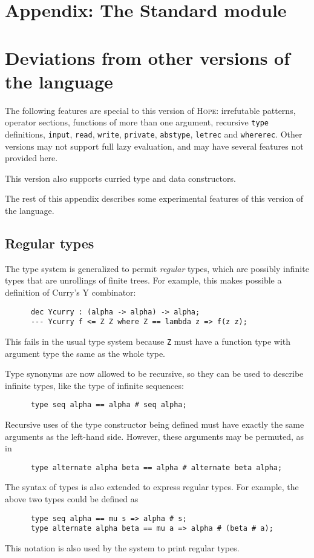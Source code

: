 \documentclass[11pt]{article}
\newcommand{\Hope}{{\scshape Hope}}
\newcommand{\Samp}[1]{\textup{\textmd{\texttt{#1}}}}
\newcommand{\Section}[2]{\section{#2}\label{sec:#1}}
\newcommand{\SubSection}[2]{\subsection{#2}\label{sec:#1}}
\begin{document}




\nocite{hope}
\nocite{tutorial}
\nocite{field&harrison}
\nocite{bailey}

\appendix

\clearpage

\Section{standard}{Appendix: The Standard module}



\clearpage

\Section{deviations}{Deviations from other versions of the language}

The following features are special to this version of \Hope:
irrefutable patterns,
operator sections,
functions of more than one argument,
recursive \Samp{type} definitions,
\Samp{input}, \Samp{read}, \Samp{write},
\Samp{private}, \Samp{abstype},
\Samp{letrec} and \Samp{whererec}.
Other versions may not support full lazy evaluation,
and may have several features not provided here.

This version also supports curried type and data constructors.

The rest of this appendix describes some experimental features of this
version of the language.

\SubSection{regular}{Regular types}

The type system is generalized to permit \emph{regular} types,
which are possibly infinite types that are unrollings of finite trees.
For example, this makes possible a definition of Curry's Y combinator:
\begin{verbatim}
      dec Ycurry : (alpha -> alpha) -> alpha;
      --- Ycurry f <= Z Z where Z == lambda z => f(z z);
\end{verbatim}
This fails in the usual type system because \Samp{Z} must have a function
type with argument type the same as the whole type.

Type synonyms are now allowed to be recursive,
so they can be used to describe infinite types,
like the type of infinite sequences:
\begin{verbatim}
      type seq alpha == alpha # seq alpha;
\end{verbatim}
Recursive uses of the type constructor being defined must have exactly
the same arguments as the left-hand side.
However, these arguments may be permuted, as in
\begin{verbatim}
      type alternate alpha beta == alpha # alternate beta alpha;
\end{verbatim}
The syntax of types is also extended to express regular types.
For example, the above two types could be defined as
\begin{verbatim}
      type seq alpha == mu s => alpha # s;
      type alternate alpha beta == mu a => alpha # (beta # a);
\end{verbatim}
This notation is also used by the system to print regular types.
\end{document}
